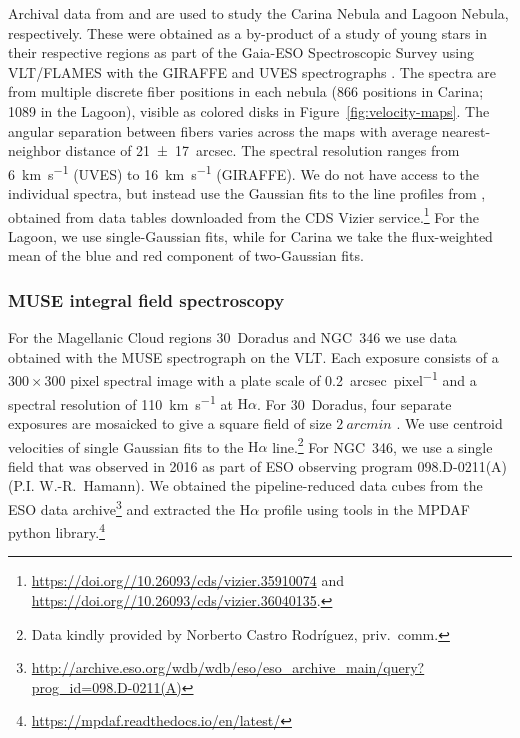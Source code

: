 \documentclass[fleqn,usenatbib, useAMS, a4paper]{mnras}
\newcommand\ha{\ensuremath{\text{H}\alpha}}
\begin{document}
Archival data from \citet{Damiani:2016a} and \citet{Damiani:2017b} are used
to study the Carina Nebula and Lagoon Nebula, respectively.
These were obtained as a by-product of a study of young stars in their respective regions
as part of the Gaia-ESO Spectroscopic Survey \citep{Gilmore:2012v, Randich:2013m}
using VLT/FLAMES with the GIRAFFE and UVES spectrographs \citep{2002Msngr.110....1P}.
The spectra are from multiple discrete fiber positions in each nebula
(866 positions in Carina; 1089 in the Lagoon),
visible as colored disks in Figure~\ref{fig:velocity-maps}.
The angular separation between fibers varies across the maps with
average nearest-neighbor distance of \SI{21 \pm 17}{arcsec}.
The spectral resolution ranges from  \SI{6}{km.s^{-1}} (UVES) to \SI{16}{km.s^{-1}} (GIRAFFE).
We do not have access to the individual spectra, but instead use the
Gaussian fits to the line profiles from \citep{Damiani:2016a, Damiani:2017b},
obtained from data tables downloaded from the CDS Vizier service.\footnote{%
  \url{https://doi.org//10.26093/cds/vizier.35910074} and
  \url{https://doi.org//10.26093/cds/vizier.36040135}.}
For the Lagoon, we use single-Gaussian fits, while for Carina we take the
flux-weighted mean of the blue and red component of two-Gaussian fits.


\subsubsection{MUSE integral field spectroscopy}
\label{sec:muse-integral-field}

For the Magellanic Cloud regions 30~Doradus and NGC~346 we use data obtained
with the MUSE spectrograph \citep{Bacon:2010a, Bacon:2014a} on the VLT.\@
Each exposure consists of a \(300 \times 300\) pixel spectral image with a plate scale
of \SI{0.2}{arcsec.pixel^{-1}} and a spectral resolution of \SI{110}{km.s^{-1}}
at \ha{}.
For 30~Doradus, four separate exposures are mosaicked to give a square field of
size \(\SI{2}{arcmin}\) \citep{Castro:2018a}. 
We use centroid velocities of single Gaussian fits to the \ha{} line.\footnote{%
  Data kindly provided by Norberto Castro Rodríguez, priv.~comm.
}
For NGC~346, we use a single field that was observed in 2016 as part of
ESO observing program 098.D-0211(A) (P.I. W.-R.~Hamann).
We obtained the pipeline-reduced data cubes from the ESO data archive\footnote{%
  \url{http://archive.eso.org/wdb/wdb/eso/eso_archive_main/query?prog_id=098.D-0211(A)}
}
and extracted the \ha{} profile using tools in the MPDAF python library.\footnote{
  \url{https://mpdaf.readthedocs.io/en/latest/}
} 
\end{document}
